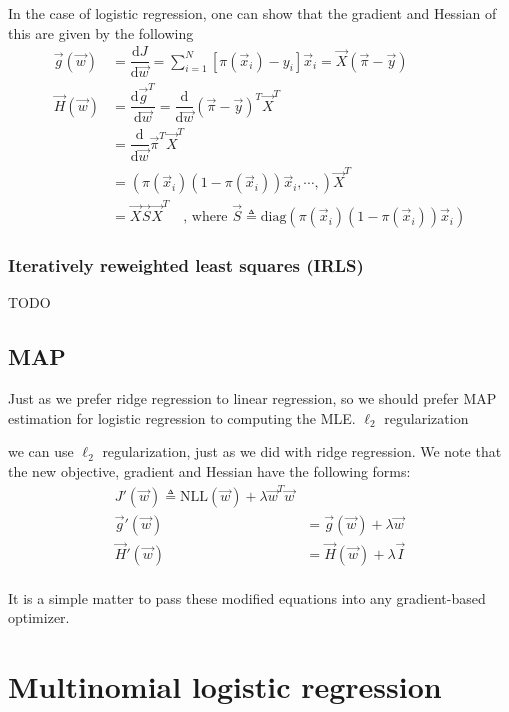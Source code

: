 In the case of logistic regression, one can show that the gradient and Hessian of this are given by the following
\begin{align}
\vec{g}(\vec{w}) &= \dfrac{\mathrm{d} J}{\mathrm{d} \vec{w}} = \sum\limits_{i=1}^N \left[\pi(\vec{x}_i) - y_i \right]\vec{x}_i = \vec{X}(\vec{\pi}-\vec{y})\\
\vec{H}(\vec{w}) &= \dfrac{\mathrm{d} \vec{g}^T}{\mathrm{d} \vec{w}}= \dfrac{\mathrm{d}}{\mathrm{d} \vec{w}} (\vec{\pi}-\vec{y})^T\vec{X}^T \nonumber \\
        &= \dfrac{\mathrm{d}}{\mathrm{d} \vec{w}} \vec{\pi}^T\vec{X}^T \nonumber \\
		&= (\pi(\vec{x}_i)(1-\pi(\vec{x}_i))\vec{x}_i, \cdots,)\vec{X}^T \nonumber \\
		&= \vec{X}\vec{S}\vec{X}^T \quad \text{, where } \vec{S} \triangleq \mathrm{diag}(\pi(\vec{x}_i)(1-\pi(\vec{x}_i))\vec{x}_i)
\end{align}


\subsubsection{Iteratively reweighted least squares (IRLS)}
\label{sec:IRLS}
TODO


\subsection{MAP}
Just as we prefer ridge regression to linear regression, so we should prefer MAP estimation for logistic regression to computing the MLE. 
$\ell_2$ regularization

we can use $\ell_2$ regularization, just as we did with ridge regression. We note that the new objective, gradient and Hessian have the following forms:
\begin{align}
J'(\vec{w}) \triangleq \mathrm{NLL}(\vec{w})+\lambda \vec{w}^T\vec{w} \\
\vec{g}'(\vec{w}) &= \vec{g}(\vec{w})+\lambda\vec{w} \\
\vec{H}'(\vec{w}) &= \vec{H}(\vec{w})+\lambda\vec{I} \\
\end{align}

It is a simple matter to pass these modified equations into any gradient-based optimizer.


\section{Multinomial logistic regression}


